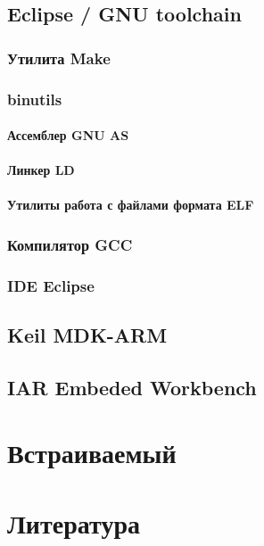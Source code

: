 \chapter{Eclipse / GNU toolchain}
\section{Утилита Make}
\section{binutils}
\subsection{Ассемблер GNU AS}
\subsection{Линкер LD}
\subsection{Утилиты работа с файлами формата ELF}
\section{Компилятор GCC}
\section{IDE Eclipse}
\chapter{Keil MDK-ARM}
\chapter{IAR Embeded Workbench}

\part{Встраиваемый \cpp}

\part{Литература}


